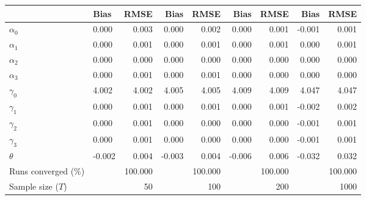 
\begin{tabular}[t]{llrrrrrrr}
\toprule
  & Bias & RMSE & Bias & RMSE & Bias & RMSE & Bias & RMSE\\
\midrule
$\alpha_{0}$ & 0.000 & 0.003 & 0.000 & 0.002 & 0.000 & 0.001 & -0.001 & 0.001\\
$\alpha_{1}$ & 0.000 & 0.001 & 0.000 & 0.001 & 0.000 & 0.001 & 0.000 & 0.001\\
$\alpha_{2}$ & 0.000 & 0.000 & 0.000 & 0.000 & 0.000 & 0.000 & 0.000 & 0.000\\
$\alpha_{3}$ & 0.000 & 0.001 & 0.000 & 0.001 & 0.000 & 0.000 & 0.000 & 0.000\\
$\gamma_{0}$ & 4.002 & 4.002 & 4.005 & 4.005 & 4.009 & 4.009 & 4.047 & 4.047\\
$\gamma_{1}$ & 0.000 & 0.001 & 0.000 & 0.001 & 0.000 & 0.001 & -0.002 & 0.002\\
$\gamma_{2}$ & 0.000 & 0.001 & 0.000 & 0.000 & 0.000 & 0.000 & -0.001 & 0.001\\
$\gamma_{3}$ & 0.000 & 0.001 & 0.000 & 0.000 & 0.000 & 0.000 & -0.001 & 0.001\\
$\theta$ & -0.002 & 0.004 & -0.003 & 0.004 & -0.006 & 0.006 & -0.032 & 0.032\\
Runs converged (\%) &  & 100.000 &  & 100.000 &  & 100.000 &  & 100.000\\
Sample size ($T$) &  & 50 &  & 100 &  & 200 &  & 1000\\
\bottomrule
\end{tabular}
